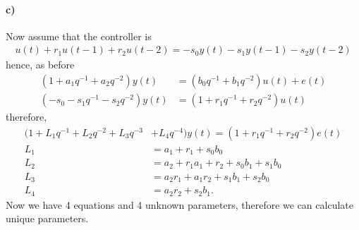 \paragraph{c)} Now assume that the controller is
\begin{align}
    u(t) + r_1u(t-1) + r_2u(t-2)= -s_0y(t) -s_1y(t-1)-s_2y(t-2)
\end{align}
hence, as before
\begin{align*}
    (1+a_1q^{-1}+a_2q^{-2})y(t) &= (b_0q^{-1}+b_1q^{-2})u(t) + e(t)\\
    (-s_0-s_1q^{-1} - s_2q^{-2})y(t) &= (1+r_1q^{-1}+r_2q^{-2})u(t)
\end{align*}
therefore,
\begin{align}
    (1 + L_1q^{-1} + L_2q^{-2} + L_3q^{-3} &+ L_4q^{-4})y(t) = (1 + r_1q^{-1} + r_2q^{-2})e(t)\\
    L_1 &= a_1 + r_1 + s_0b_0 \nonumber\\
    L_2 &= a_2 + r_1a_1 + r_2 + s_0b_1 + s_1b_0\nonumber\\
    L_3 &= a_2r_1 + a_1r_2 + s_1b_1 + s_2b_0\nonumber\\
    L_4 &= a_2r_2 + s_2b_1. \nonumber
\end{align}
Now we have 4 equations and 4 unknown parameters, therefore we can calculate unique parameters.